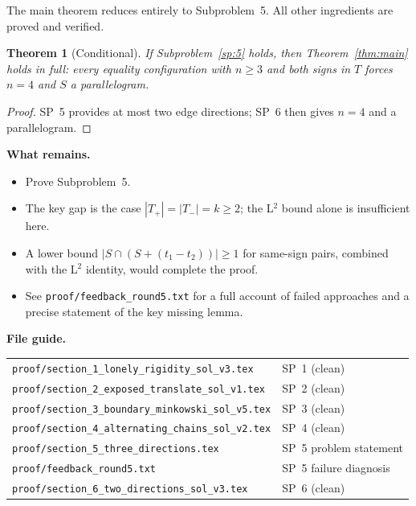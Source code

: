 \documentclass[12pt,a4paper]{article}
\newtheorem{theorem}{Theorem}
\theoremstyle{definition}
\begin{document}
The main theorem reduces entirely to Subproblem~5.  All other ingredients are proved
and verified.

\begin{theorem}[Conditional]\label{thm:cond}
If Subproblem~\ref{sp:5} holds, then Theorem~\ref{thm:main} holds in full:
every equality configuration with $n\ge 3$ and both signs in $T$ forces $n=4$
and $S$ a parallelogram.
\end{theorem}

\begin{proof}
SP~5 provides at most two edge directions; SP~6 then gives $n=4$ and a parallelogram.
\end{proof}

\bigskip
\begin{notebox}
\textbf{What remains.}
\begin{itemize}
\item Prove Subproblem~5.
\item The key gap is the case $|T_+|=|T_-|=k\ge 2$;
      the L$^2$ bound alone is insufficient here.
\item A lower bound $|S\cap(S+(t_1-t_2))|\ge 1$ for same-sign pairs,
      combined with the L$^2$ identity, would complete the proof.
\item See \texttt{proof/feedback\_round5.txt} for a full account of failed approaches
      and a precise statement of the key missing lemma.
\end{itemize}
\end{notebox}

\bigskip
\noindent\textbf{File guide.}

\medskip
\noindent
\begin{tabular}{@{}ll@{}}
\texttt{proof/section\_1\_lonely\_rigidity\_sol\_v3.tex} & SP~1 (clean)\\
\texttt{proof/section\_2\_exposed\_translate\_sol\_v1.tex} & SP~2 (clean)\\
\texttt{proof/section\_3\_boundary\_minkowski\_sol\_v5.tex} & SP~3 (clean)\\
\texttt{proof/section\_4\_alternating\_chains\_sol\_v2.tex} & SP~4 (clean)\\
\texttt{proof/section\_5\_three\_directions.tex} & SP~5 problem statement\\
\texttt{proof/feedback\_round5.txt} & SP~5 failure diagnosis\\
\texttt{proof/section\_6\_two\_directions\_sol\_v3.tex} & SP~6 (clean)\\
\end{tabular}
\end{document}
